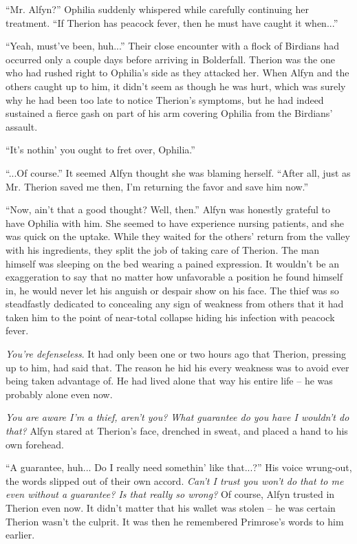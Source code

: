 ``Mr. Alfyn?'' Ophilia suddenly whispered while carefully continuing her treatment. ``If Therion has peacock fever, then he must have caught it when...''

``Yeah, must've been, huh...'' Their close encounter with a flock of Birdians had occurred only a couple days before arriving in Bolderfall. Therion was the one who had rushed right to Ophilia's side as they attacked her. When Alfyn and the others caught up to him, it didn't seem as though he was hurt, which was surely why he had been too late to notice Therion's symptoms, but he had indeed sustained a fierce gash on part of his arm covering Ophilia from the Birdians' assault. 

``It's nothin' you ought to fret over, Ophilia.''

``...Of course.'' It seemed Alfyn thought she was blaming herself. ``After all, just as Mr. Therion saved me then, I'm returning the favor and save him now.''

``Now, ain't that a good thought? Well, then.'' Alfyn was honestly grateful to have Ophilia with him. She seemed to have experience nursing patients, and she was quick on the uptake. While they waited for the others' return from the valley with his ingredients, they split the job of taking care of Therion. The man himself was sleeping on the bed wearing a pained expression. It wouldn't be an exaggeration to say that no matter how unfavorable a position he found himself in, he would never let his anguish or despair show on his face. The thief was so steadfastly dedicated to concealing any sign of weakness from others that it had taken him to the point of near-total collapse hiding his infection with peacock fever.

\emph{You're defenseless}. It had only been one or two hours ago that Therion, pressing up to him, had said that. The reason he hid his every weakness was to avoid ever being taken advantage of. He had lived alone that way his entire life -- he was probably alone even now.

\emph{You are aware I'm a thief, aren't you? What guarantee do you have I wouldn't do that?} Alfyn stared at Therion's face, drenched in sweat, and placed a hand to his own forehead.

``A guarantee, huh... Do I really need somethin' like that...?'' His voice wrung-out, the words slipped out of their own accord. \emph{Can't I trust you won't do that to me even without a guarantee? Is that really so wrong?} Of course, Alfyn trusted in Therion even now. It didn't matter that his wallet was stolen -- he was certain Therion wasn't the culprit. It was then he remembered Primrose's words to him earlier.

